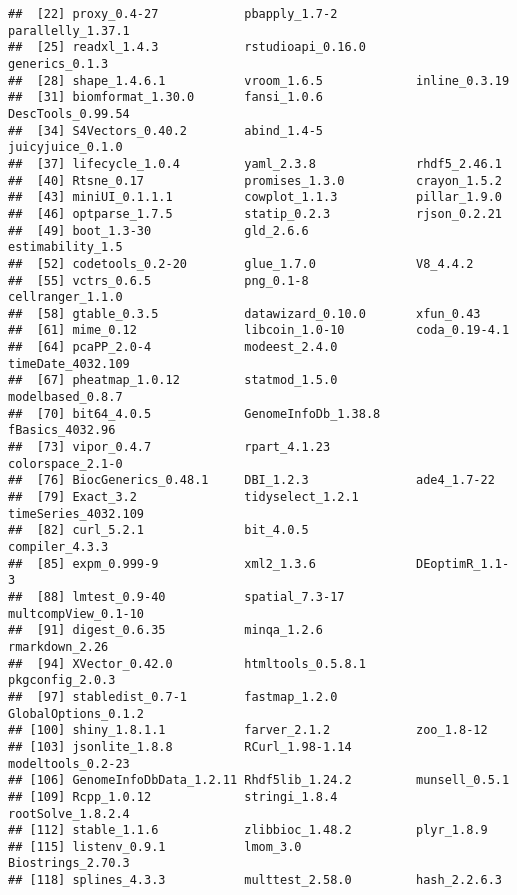 \documentclass[
]{article}
\begin{document}
\begin{verbatim}
##  [22] proxy_0.4-27            pbapply_1.7-2           parallelly_1.37.1      
##  [25] readxl_1.4.3            rstudioapi_0.16.0       generics_0.1.3         
##  [28] shape_1.4.6.1           vroom_1.6.5             inline_0.3.19          
##  [31] biomformat_1.30.0       fansi_1.0.6             DescTools_0.99.54      
##  [34] S4Vectors_0.40.2        abind_1.4-5             juicyjuice_0.1.0       
##  [37] lifecycle_1.0.4         yaml_2.3.8              rhdf5_2.46.1           
##  [40] Rtsne_0.17              promises_1.3.0          crayon_1.5.2           
##  [43] miniUI_0.1.1.1          cowplot_1.1.3           pillar_1.9.0           
##  [46] optparse_1.7.5          statip_0.2.3            rjson_0.2.21           
##  [49] boot_1.3-30             gld_2.6.6               estimability_1.5       
##  [52] codetools_0.2-20        glue_1.7.0              V8_4.4.2               
##  [55] vctrs_0.6.5             png_0.1-8               cellranger_1.1.0       
##  [58] gtable_0.3.5            datawizard_0.10.0       xfun_0.43              
##  [61] mime_0.12               libcoin_1.0-10          coda_0.19-4.1          
##  [64] pcaPP_2.0-4             modeest_2.4.0           timeDate_4032.109      
##  [67] pheatmap_1.0.12         statmod_1.5.0           modelbased_0.8.7       
##  [70] bit64_4.0.5             GenomeInfoDb_1.38.8     fBasics_4032.96        
##  [73] vipor_0.4.7             rpart_4.1.23            colorspace_2.1-0       
##  [76] BiocGenerics_0.48.1     DBI_1.2.3               ade4_1.7-22            
##  [79] Exact_3.2               tidyselect_1.2.1        timeSeries_4032.109    
##  [82] curl_5.2.1              bit_4.0.5               compiler_4.3.3         
##  [85] expm_0.999-9            xml2_1.3.6              DEoptimR_1.1-3         
##  [88] lmtest_0.9-40           spatial_7.3-17          multcompView_0.1-10    
##  [91] digest_0.6.35           minqa_1.2.6             rmarkdown_2.26         
##  [94] XVector_0.42.0          htmltools_0.5.8.1       pkgconfig_2.0.3        
##  [97] stabledist_0.7-1        fastmap_1.2.0           GlobalOptions_0.1.2    
## [100] shiny_1.8.1.1           farver_2.1.2            zoo_1.8-12             
## [103] jsonlite_1.8.8          RCurl_1.98-1.14         modeltools_0.2-23      
## [106] GenomeInfoDbData_1.2.11 Rhdf5lib_1.24.2         munsell_0.5.1          
## [109] Rcpp_1.0.12             stringi_1.8.4           rootSolve_1.8.2.4      
## [112] stable_1.1.6            zlibbioc_1.48.2         plyr_1.8.9             
## [115] listenv_0.9.1           lmom_3.0                Biostrings_2.70.3      
## [118] splines_4.3.3           multtest_2.58.0         hash_2.2.6.3           

\end{verbatim}
\end{document}

